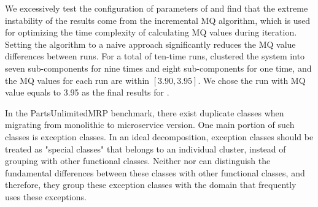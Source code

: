 We excessively test the configuration of parameters of \bn and find that the extreme instability of the results come from the incremental MQ algorithm, which is used for optimizing the time complexity of calculating MQ values during iteration. Setting the algorithm to a naive approach significantly reduces the MQ value differences between runs. For a total of ten-time runs, \bn clustered the system into seven sub-components for nine times and eight sub-components for one time, and the MQ values for each run are within $[3.90, 3.95]$. We chose the run with MQ value equals to 3.95 as the final results for \bn.

In the PartsUnlimitedMRP benchmark, there exist duplicate classes when migrating from monolithic to microservice version. One main portion of such classes is exception classes. In an ideal decomposition, exception classes should be treated as "special classes" that belongs to an individual cluster, instead of grouping with other functional classes. Neither \bn nor \fs can distinguish the fundamental differences between these classes with other functional classes, and therefore, they group these exception classes with the domain that frequently uses these exceptions. 


